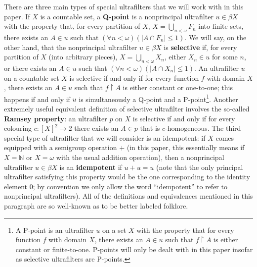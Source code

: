 \documentclass[10pt]{amsart}
\theoremstyle{definition}
\theoremstyle{remark}
\begin{document}
There are three main types of special ultrafilters that we will work with in this paper. If $X$ is a countable set, a {\bf Q-point} is a nonprincipal ultrafilter $u\in\beta X$ with the property that, for every partition of $X$, $X=\bigcup_{n<\omega}F_n$ into finite sets, there exists an $A\in u$ such that $(\forall n<\omega)(|A\cap F_n|\leq 1)$. We will say, on the other hand, that the nonprincipal ultrafilter $u\in\beta X$ is {\bf selective} if, for every partition of $X$ (into arbitrary pieces), $X=\bigcup_{n<\omega}X_n$, either $X_n\in u$ for some $n$, or there exists an $A\in u$ such that $(\forall n<\omega)(|A\cap X_n|\leq 1)$. An ultrafilter $u$ on a countable set $X$ is selective if and only if for every function $f$ with domain $X$, there exists an $A\in u$ such that $f\upharpoonright A$ is either constant or one-to-one; this happens if and only if $u$ is simultaneously a Q-point and a P-point\footnote{A P-point is an ultrafilter $u$ on a set $X$ with the property that for every function $f$ with domain $X$, there exists an $A\in u$ such that $f\upharpoonright A$ is either constant or finite-to-one. P-points will only be dealt with in this paper insofar as selective ultrafilters are P-points.}. Another extremely useful equivalent definition of selective ultrafilter involves the so-called {\bf Ramsey property}: an ultrafilter $p$ on $X$ is selective if and only if for every colouring $c:[X]^2\longrightarrow 2$ there exists an $A\in p$ that is $c$-homogeneous. The third special type of ultrafilter that we will consider is an idempotent: if $X$ comes equipped with a semigroup operation $+$ (in this paper, this essentially means if $X=\mathbb N$ or $X=\omega$ with the usual addition operation), then a nonprincipal ultrafilter $u\in\beta X$ is an {\bf idempotent} if $u+u=u$ (note that the only principal ultrafilter satisfying this property would be the one corresponding to the identity element $0$; by convention we only allow the word ``idempotent'' to refer to nonprincipal ultrafilters). All of the definitions and equivalences mentioned in this paragraph are so well-known as to be better labeled folklore.
\end{document}
